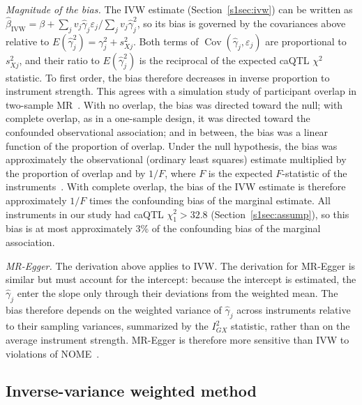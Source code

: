 \noindent \textit{Magnitude of the bias.} The IVW estimate (Section~\ref{s1sec:ivw}) can be written as $\hat{\beta}_{\mathrm{IVW}}=\beta+\sum_j v_j\hat{\gamma}_j\varepsilon_j/\sum_j v_j\hat{\gamma}_j^2$, so its bias is governed by the covariances above relative to $E(\hat{\gamma}_j^2)=\gamma_j^2+s_{Xj}^2$. Both terms of $\operatorname{Cov}(\hat{\gamma}_j,\varepsilon_j)$ are proportional to $s_{Xj}^2$, and their ratio to $E(\hat{\gamma}_j^2)$ is the reciprocal of the expected caQTL $\chi^2$ statistic. To first order, the bias therefore decreases in inverse proportion to instrument strength. This agrees with a simulation study of participant overlap in two-sample MR~\cite{burgess2016overlap}. With no overlap, the bias was directed toward the null; with complete overlap, as in a one-sample design, it was directed toward the confounded observational association; and in between, the bias was a linear function of the proportion of overlap. Under the null hypothesis, the bias was approximately the observational (ordinary least squares) estimate multiplied by the proportion of overlap and by $1/F$, where $F$ is the expected $F$-statistic of the instruments~\cite{burgess2016overlap}. With complete overlap, the bias of the IVW estimate is therefore approximately $1/F$ times the confounding bias of the marginal estimate. All instruments in our study had caQTL $\chi^2_1>32.8$ (Section~\ref{s1sec:assump}), so this bias is at most approximately 3\% of the confounding bias of the marginal association.

\noindent \textit{MR-Egger.} The derivation above applies to IVW. The derivation for MR-Egger is similar but must account for the intercept: because the intercept is estimated, the $\hat{\gamma}_j$ enter the slope only through their deviations from the weighted mean. The bias therefore depends on the weighted variance of $\hat{\gamma}_j$ across instruments relative to their sampling variances, summarized by the $I^2_{GX}$ statistic, rather than on the average instrument strength. MR-Egger is therefore more sensitive than IVW to violations of NOME~\cite{bowden2016nome}.

\subsection*{Inverse-variance weighted method}
\label{s1sec:ivw}

